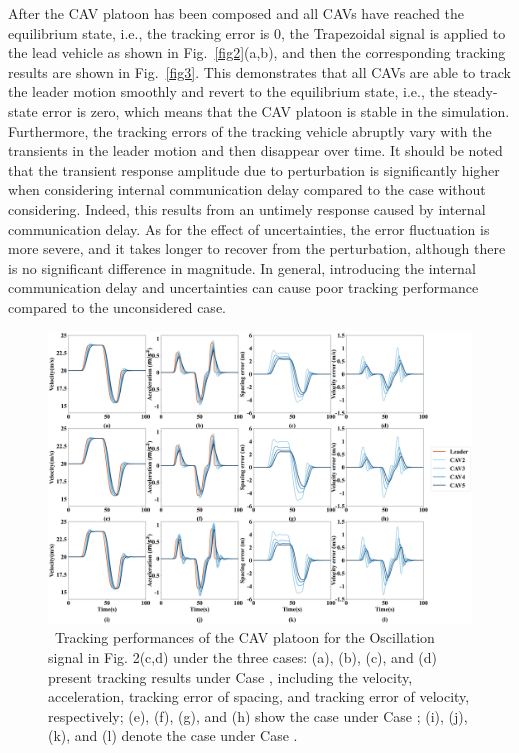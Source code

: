 \documentclass[journal]{IEEEtran}
\begin{document}
After the CAV platoon has been composed and all CAVs have reached the equilibrium state, i.e., the tracking error is 0, the Trapezoidal signal is applied to the lead vehicle as shown in Fig.~\ref{fig2}(a,b), and then the corresponding tracking results are shown in Fig.~\ref{fig3}. This demonstrates that all CAVs are able to track the leader motion smoothly and revert to the equilibrium state, i.e., the steady-state error is zero, which means that the CAV platoon is stable in the simulation. Furthermore, the tracking errors of the tracking vehicle abruptly vary with the transients in the leader motion and then disappear over time. It should be noted that the transient response amplitude due to perturbation is significantly higher when considering internal communication delay compared to the case without considering. Indeed, this results from an untimely response caused by internal communication delay. As for the effect of uncertainties, the error fluctuation is more severe, and it takes longer to recover from the perturbation, although there is no significant difference in magnitude. In general, introducing the internal communication delay and uncertainties can cause poor tracking performance compared to the unconsidered case.

\begin{figure}
  \centering
  \includegraphics[width=16cm]{figs/fig4.png}
  \caption{~Tracking performances of the CAV platoon for the Oscillation signal in Fig. 2(c,d) under the three cases: (a), (b), (c), and (d) present tracking results under Case \uppercase\expandafter{}, including the velocity, acceleration, tracking error of spacing, and tracking error of velocity, respectively; (e), (f), (g), and (h) show the case under Case  \uppercase\expandafter{}; (i), (j), (k), and (l) denote the case under Case \uppercase\expandafter{}.}
  \label{fig4}
\end{figure}
\end{document}
